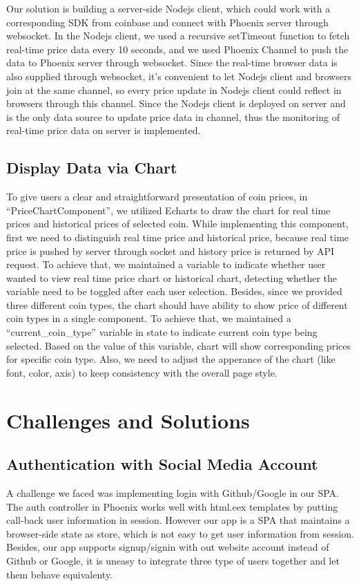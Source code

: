 Our solution is building a server-side Nodejs client, which 
could work with a corresponding SDK from coinbase and connect 
with Phoenix server through websocket. In the Nodejs client, 
we used a recursive setTimeout function to fetch real-time 
price data every 10 seconds, and we used Phoenix Channel to 
push the data to Phoenix server through websocket. Since the 
real-time browser data is also supplied through websocket, 
it's convenient to let Nodejs client and browsers join at 
the same channel, so every price update in Nodejs client 
could reflect in browsers through this channel. Since the 
Nodejs client is deployed on server and is the only data 
source to update price data in channel, thus the monitoring 
of real-time price data on server is implemented.

\subsection{Display Data via Chart}
To give users a clear and straightforward presentation of 
coin prices, in “PriceChartComponent”, we utilized Echarts 
to draw the chart for real time prices and historical prices 
of selected coin. While implementing this component, first we 
need to distinguish real time price and historical price, 
because real time price is pushed by server through socket 
and history price is returned by API request. To achieve that, 
we maintained a variable to indicate whether user wanted to 
view real time price chart or historical chart, detecting 
whether the variable need to be toggled after each user 
selection. Besides, since we provided three different coin 
types, the chart should have ability to show price of different 
coin types in a single component. To achieve that, we maintained 
a “current\_coin\_type” variable in state to indicate current 
coin type being selected. Based on the value of this variable, 
chart will show corresponding prices for specific coin type. 
Also, we need to adjust the apperance of the chart (like 
font, color, axis) to keep consistency with the overall page style.


\section{Challenges and Solutions}
\subsection{Authentication with Social Media Account}
A challenge we faced was implementing login with Github/Google 
in our SPA. The auth controller in Phoenix works well with 
html.eex templates by putting call-back user information in 
session. However our app is a SPA that maintains a browser-side 
state as store, which is not easy to get user information from 
session. Besides, our app supports signup/signin with out website
account instead of Github or Google, it is uneasy to integrate 
three type of users together and let them behave equivalenty.


